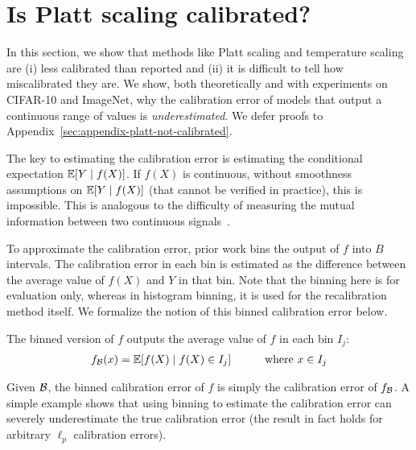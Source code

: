\section{Is Platt scaling calibrated?}
\label{sec:challenges-measuring}

In this section, we show that methods like Platt scaling and temperature scaling are (i) less calibrated than reported and (ii) it is difficult  to tell how miscalibrated they are. We show, both theoretically and with experiments on CIFAR-10 and ImageNet, why the calibration error of models that output a continuous range of values is \emph{underestimated}.
We defer proofs to Appendix~\ref{sec:appendix-platt-not-calibrated}.

The key to estimating the calibration error is estimating the conditional expectation $\expect[Y \mid f(X)]$.  If $f(X)$ is continuous, without smoothness assumptions on $\expect[Y \mid f(X)]$ (that cannot be verified in practice), this is impossible. This is analogous to the difficulty of measuring the mutual information between two continuous signals~\cite{paninski2003entropy}.

To approximate the calibration error, prior work bins the output of $f$ into $B$ intervals.
The calibration error in each bin is estimated as the difference between the average value of $f(X)$ and $Y$ in that bin.
Note that the binning here is for evaluation only, whereas in histogram binning, it is used for the recalibration method itself.
We formalize the notion of this binned calibration error below.

\begin{definition}
The binned version of $f$ outputs the average value of $f$ in each bin $I_j$:
\begin{align}
  f_{\mathcal{B}}(x) = \pl{mathbb} \expect[f(X) \mid f(X) \in I_j] \quad\quad\quad \mbox{where }x \in I_j
\end{align} 
\end{definition}

Given $\bins{}$, the binned calibration error of $f$ is simply the calibration error of $f_{\bins{}}$.
A simple example shows that using binning to estimate the calibration error can severely underestimate the true calibration error (the result in fact holds for arbitrary $\ell_p$ calibration errors).

\newcommand{\continuousNotCalibratedText}{
  For any binning scheme $\bins{}$, $p \in \mathbb{Z}^+$, and continuous bijective function $f : [0, 1] \to [0, 1]$, there exists a distribution \pl{mathbb} $P$ over $X, Y$ s.t. $\ce(f_{\bins{}}) = 0$ but $\ce(f) \geq 0.49$.
Note that for all $f$, $0 \leq \ce(f) \leq 1$.
}

